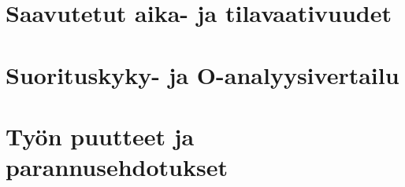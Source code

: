 \documentclass[11pt,a4paper]{article}
\begin{document}
\section{Saavutetut aika- ja tilavaativuudet}
\section{Suorituskyky- ja O-analyysivertailu}

\section{Työn puutteet ja parannusehdotukset}
\end{document}

